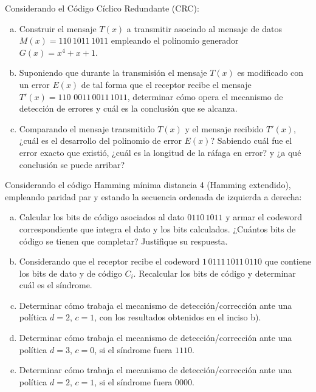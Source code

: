 \documentclass[12pt,a4paper]{article}
\begin{document}
 Considerando el Código Cíclico Redundante (CRC):
\begin{enumerate}[a)]
	\item Construir el mensaje $T(x)$ a transmitir asociado al mensaje de datos
	$M(x) = 110\,1011\,1011$ empleando el polinomio generador $G(x) = x^4 + x + 1$.

	\item Suponiendo que durante la transmisión el mensaje $T(x)$ es modificado con un error $E(x)$ de tal forma que el receptor recibe el mensaje $T'(x) = 110\,\, 0011\,0011\,1011$, determinar cómo opera el mecanismo de detección de errores y cuál es la conclusión que se alcanza.

	\item Comparando el mensaje transmitido $T(x)$ y el mensaje recibido $T'(x)$, ¿cuál es el desarrollo del polinomio de error $E(x)$? Sabiendo cuál fue el error exacto que existió, ¿cuál es la longitud de la ráfaga en error? y ¿a qué conclusión se puede arribar?
\end{enumerate}

 Considerando el código Hamming mínima distancia 4 (Hamming extendido), empleando paridad par y estando la secuencia ordenada de izquierda a derecha:
\begin{enumerate}[a)]

	\item Calcular los bits de código asociados al dato $0110\,1011$ y armar el codeword correspondiente que integra el dato y los bits calculados. ¿Cuántos bits de código se tienen que completar? Justifique su respuesta. 

	\item Considerando que el receptor recibe el codeword $1\,0111\,1011\,0110$ que contiene los bits de dato y de código $C_i$. Recalcular los bits de código y determinar cuál es el síndrome.

	\item Determinar cómo trabaja el mecanismo de detección/corrección ante una política $d=2$, $c=1$, con los resultados obtenidos en el inciso b).

	\item Determinar cómo trabaja el mecanismo de detección/corrección ante una política $d=3$, $c=0$, si el síndrome fuera $1110$.

	\item Determinar cómo trabaja el mecanismo de detección/corrección ante una política $d=2$, $c=1$, si el síndrome fuera $0000$.


\end{enumerate}
\end{document}
